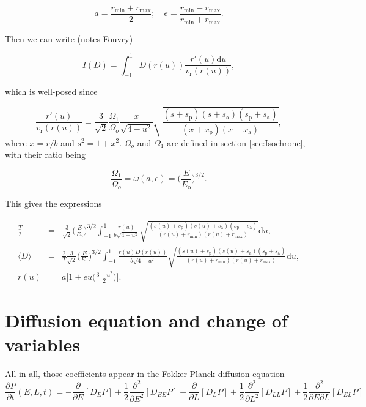 \documentclass[11pt]{article}
\newcommand{\rr}{\mathrm{r}}
\newcommand{\ro}{\mathrm{o}}
\newcommand{\ra}{\mathrm{a}}
\newcommand{\rp}{\mathrm{p}}
\newcommand{\rd}{{\mathrm{d}}}
\newcommand{\vr}{v_{\rr}}
\newcommand{\Eo}{E_{\ro}}
\newcommand{\rmax}{r_{\max}}
\newcommand{\rmin}{r_{\min}}
\newcommand{\xa}{x_{\ra}}
\newcommand{\xrp}{x_{\rp}}
\newcommand{\sa}{s_{\ra}}
\newcommand{\srp}{s_{\rp}}
\newcommand{\dE}{D_{E}}
\newcommand{\dL}{D_{L}}
\newcommand{\dEE}{D_{EE}}
\newcommand{\dLL}{D_{LL}}
\newcommand{\dEL}{D_{EL}}
\begin{document}
\begin{equation}
  a=\frac{\rmin+\rmax}{2};\quad e = \frac{\rmin-\rmax}{\rmin+\rmax} .
  \label{eq:effective_e_a_Iso}
\end{equation}

Then we can write (notes Fouvry)

\begin{equation}
  I(D) = \int_{-1}^{1} D(r(u)) \frac{ r'(u) \rd u}{\vr(r(u))} ,
  \label{eq:Iso_chg_var_eff_anomaly}
\end{equation}

which is well-posed since

\begin{equation}
   \frac{ r'(u) }{\vr(r(u))} = \frac{3}{\sqrt{2}} \frac{\Omega_{1}}{\Omega_{o}} \frac{x}{\sqrt{4-u^{2}}} \sqrt{\frac{(s+\srp)(s+\sa)(\srp+\sa)}{(x+\xrp)(x+\xa)} } ,
  \label{eq:dThdu_Iso}
\end{equation}
where $x=r/b$ and $s^{2}=1+x^{2}$. $\Omega_{o}$ and $\Omega_{1}$ are defined in section \ref{sec:Isochrone}, with their ratio being

$$  \frac{\Omega_{1}}{\Omega_{o}} = \omega(a,e) = \bigg(\frac{E}{\Eo}\bigg)^{3/2} .$$

This gives the expressions

\begin{equation}
  \boxed{
    \begin{array}{ccl}
      \displaystyle{\frac{T}{2}} &=&  \displaystyle{\frac{3 }{\sqrt{2}} \bigg(\frac{E}{\Eo}\bigg)^{3/2}\int_{-1}^{1} \frac{r(u) }{b\sqrt{4-u^{2}}} \sqrt{\frac{(s(u)+\srp)(s(u)+\sa)(\srp+\sa)}{(r(u)+\rmin)(r(u)+\rmax)} }  \rd u ,} \\
    \langle D \rangle &=&  \displaystyle{\frac{2}{T}\frac{3}{\sqrt{2}}\bigg(\frac{E}{\Eo}\bigg)^{3/2} \int_{-1}^{1} \frac{r(u)  D(r(u))}{b\sqrt{4-u^{2}}} \sqrt{\frac{(s(u)+\srp)(s(u)+\sa)(\srp+\sa)}{(r(u)+\rmin)(r(u)+\rmax)} }  \rd u ,} \\
    r(u) &=& \displaystyle{a\bigg[1+e u\bigg(\frac{3-u^{2}}{2}\bigg)\bigg] .}
  \end{array}
  }
  \label{eq:Iso_chg_var_eff_anomaly_normalizedUnits}
\end{equation}


\section{Diffusion equation and change of variables}
\label{sec:diffEq_changeVar}

All in all, those coefficients appear in the Fokker-Planck diffusion
equation
\begin{equation}
\frac{\partial P}{\partial t}(E,L,t)=-\frac{\partial}{\partial E}\left[\dE P\right]+\frac{1}{2}\frac{\partial^{2}}{\partial E^{2}}\left[\dEE P\right]-\frac{\partial}{\partial L}\left[\dL P\right]+\frac{1}{2}\frac{\partial^{2}}{\partial L^{2}}\left[\dLL P\right]+\frac{1}{2}\frac{\partial^{2}}{\partial E\partial L}\left[\dEL P\right]
\label{eq:FP:equation}
\end{equation}
\end{document}
